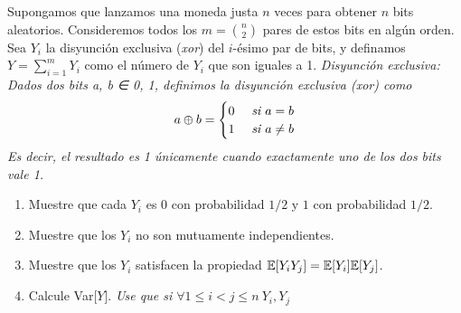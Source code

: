 \newpage
\begin{problema}{3}
	Supongamos que lanzamos una moneda justa $n$ veces para obtener $n$ bits aleatorios. Consideremos todos los $m = \binom{n}{2}$ pares de estos bits en algún orden. Sea $Y_i$ la disyunción exclusiva (\emph{xor}) del $i$-ésimo par de bits, y definamos $Y = \sum^m_{i=1} Y_i$ como el número de $Y_i$ que son iguales a 1. \emph{Disyunción exclusiva: Dados dos bits a, b ∈ {0, 1}, definimos la disyunción exclusiva (xor) como}
	\[
		a \oplus b = \begin{cases}
			0 & \text{\emph{ si $a=b$}} \\
			1 & \text{\emph{ si $a\neq b$}}
		\end{cases}
	\]
	\emph{Es decir, el resultado es 1 únicamente cuando exactamente uno de los dos bits vale 1.}
	\begin{enumerate}[label=\alph*)]
		\item Muestre que cada $Y_i$ es $0$ con probabilidad $1/2$ y $1$ con probabilidad $1/2$.
		\item Muestre que los $Y_i$ no son mutuamente independientes.
		\item Muestre que los $Y_i$ satisfacen la propiedad $\mathbb{E}[Y_iY_j]=\mathbb{E}[Y_i]\mathbb{E}[Y_j]$.
		\item Calcule Var[$Y$]. \emph{Use que si $\forall 1 \leq i < j \leq n \ Y_i, Y_j$}
	\end{enumerate}
\end{problema}
\begin{solucion}
	
\end{solucion}
